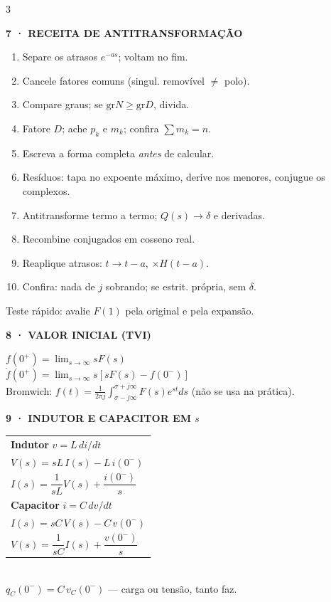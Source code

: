 \documentclass[10pt,a4paper]{article}
\newcommand{\sect}[1]{\vspace{1.2mm}{\color{acc}\rule{\linewidth}{0.9pt}}\vspace{-0.3mm}\par
  {\footnotesize\bfseries\color{acc}\MakeUppercase{#1}}\par\vspace{0.6mm}}
\newcommand{\note}[1]{{\color{gry}#1}\par\vspace{0.4mm}}
\newcommand{\ci}{0^{-}}
\newcommand{\cip}{0^{+}}
\begin{document}
\begin{multicols}{3}
\sect{7 · Receita de antitransformação}
\begin{enumerate}[nosep]
\item Separe os atrasos $e^{-as}$; voltam no fim.
\item Cancele fatores comuns (singul. removível $\ne$ polo).
\item Compare graus; se $\mathrm{gr}N\ge\mathrm{gr}D$, divida.
\item Fatore $D$; ache $p_k$ e $m_k$; confira $\sum m_k=n$.
\item Escreva a forma completa \emph{antes} de calcular.
\item Resíduos: tapa no expoente máximo, derive nos menores, conjugue os complexos.
\item Antitransforme termo a termo; $Q(s)\to\delta$ e derivadas.
\item Recombine conjugados em cosseno real.
\item Reaplique atrasos: $t\to t{-}a$, $\times H(t{-}a)$.
\item Confira: nada de $j$ sobrando; se estrit. própria, sem $\delta$.
\end{enumerate}
\note{Teste rápido: avalie $F(1)$ pela original e pela expansão.}

\sect{8 · Valor inicial (TVI)}
$f(\cip)=\lim_{s\to\infty}sF(s)$\\[0.4mm]
$\dot f(\cip)=\lim_{s\to\infty}s[sF(s)-f(\ci)]$\\[0.4mm]
\note{Bromwich: $f(t)=\frac{1}{2\pi j}\int_{\sigma-j\infty}^{\sigma+j\infty}F(s)e^{st}ds$ (não se usa na prática).}

\sect{9 · Indutor e capacitor em $s$}
\begin{tabular}{@{}l@{}}
\textbf{Indutor} $v=L\,di/dt$\\
$V(s)=sL\,I(s)-L\,i(\ci)$\\
$I(s)=\dfrac{1}{sL}V(s)+\dfrac{i(\ci)}{s}$\\[1mm]
\textbf{Capacitor} $i=C\,dv/dt$\\
$I(s)=sC\,V(s)-C\,v(\ci)$\\
$V(s)=\dfrac{1}{sC}I(s)+\dfrac{v(\ci)}{s}$\\
\end{tabular}\\[0.8mm]
$q_C(\ci)=C\,v_C(\ci)$ — carga ou tensão, tanto faz.


\end{multicols}
\end{document}
